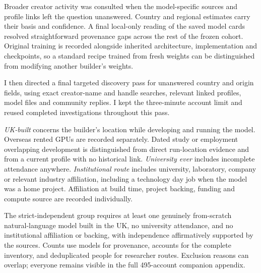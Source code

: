 Broader creator activity was consulted when the model-specific
sources and profile links left the question unanswered. Country and regional
estimates carry their basis and confidence. A final local-only reading of
the saved model cards resolved straightforward provenance gaps across the
rest of the frozen cohort. Original training is recorded alongside inherited
architecture, implementation and checkpoints, so a standard recipe trained
from fresh weights can be distinguished from modifying another builder's
weights.

I then directed a final targeted discovery pass for unanswered country and
origin fields, using exact creator-name and handle searches, relevant
linked profiles, model files and community replies. I kept the three-minute
account limit and reused completed investigations throughout this pass.

\emph{UK-built} concerns the builder's location while developing and running
the model. Overseas rented GPUs are recorded separately. Dated study or
employment overlapping development is distinguished from direct run-location
evidence and from a current profile with no historical link. \emph{University
ever} includes incomplete attendance anywhere. \emph{Institutional route}
includes university, laboratory, company or relevant industry affiliation,
including a technology day job when the model was a home project.
Affiliation at build time, project backing, funding and compute source are
recorded individually.

The strict-independent group requires at least one genuinely from-scratch
natural-language model built in the UK, no university attendance, and no
institutional affiliation or backing, with independence affirmatively
supported by the sources. Counts use
models for provenance, accounts for the complete inventory, and deduplicated
people for researcher routes. Exclusion reasons can overlap; everyone remains
visible in the full 495-account companion appendix.
